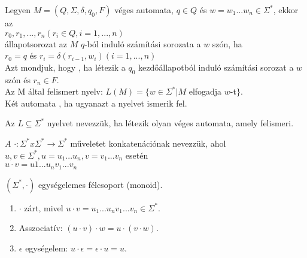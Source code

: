 \begin{frame}
\begin{tcolorbox}[squeezed title={Def.: Számítási sorozat, elfogadott szó, felismert nyelv}]
Legyen $M = (Q, {\Sigma}, {\delta}, q_0, F)$ véges automata, $q \in Q$ és $w = w_1...w_n \in {\Sigma}^*$, ekkor az\\
\mmedskip
$r_0, r_1, ..., r_n (r_i \in Q, i = 1, ..., n)$\\
\mmedskip
állapotsorozat az $M$ $q$-ból induló számítási sorozata a $w$ szón, ha\\
\mmedskip
$r_0 = q$ és $r_i = {\delta}(r_{i - 1}, w_i)(i = 1, ..., n)$\\
\mbigskip
{} Azt mondjuk, hogy , ha létezik a $q_0$ kezdőállapotból induló számítási sorozat a $w$ szón és $r_n \in F$.\\
\mbigskip
{} Az M által felismert nyelv: $L(M) = \{w \in {\Sigma}^* | M$ elfogadja $w$-t$\}$.\\
\mbigskip
Két automata , ha ugyanazt a nyelvet ismerik fel.
\end{tcolorbox}

\begin{tcolorbox}[title={Def.: Felismerhető nyelv}]
Az $L \subseteq {\Sigma}^*$ nyelvet  nevezzük, ha létezik olyan véges automata, amely felismeri.
\end{tcolorbox}

\begin{tcolorbox}[title={Def.: Konkatenáció}]
$A$ $\cdot : {\Sigma}^* x {\Sigma}^* \rightarrow {\Sigma}^*$ műveletet konkatenációnak nevezzük, ahol\\
\mmedskip
$u, v \in {\Sigma}^*, u = u_1...u_n, v = v_1...v_n$ esetén\\
$u \cdot v = u1...u_nv_1...v_n$
\end{tcolorbox}

\begin{tcolorbox}[title={Ész}]
$({\Sigma}^*, {\cdot})$ egységelemes félcsoport (monoid).\\
\begin{enumerate}
\item $\cdot$ zárt, mivel $u \cdot v = u_1...u_nv_1...v_n \in {\Sigma}^*$.
\item Asszociatív: $(u \cdot v) \cdot w = u \cdot (v \cdot w)$.
\item $\epsilon$ egységelem: $u \cdot \epsilon = \epsilon \cdot u = u$.
\end{enumerate}
\end{tcolorbox}

\end{frame}

